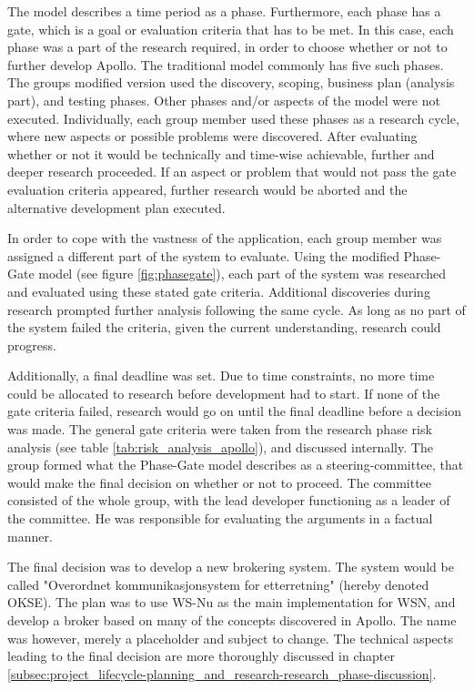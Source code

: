 The model describes a time period as a phase. Furthermore, each phase has a gate, which is a goal or evaluation criteria that has to be met. In this case, each phase was a part of the research required, in order to choose whether or not to further develop Apollo. The traditional model commonly has five such phases. The groups modified version used the discovery, scoping, business plan (analysis part), and testing phases. Other phases and/or aspects of the model were not executed. Individually, each group member used these phases as a research cycle, where new aspects or possible problems were discovered. After evaluating whether or not it would be technically and time-wise achievable, further and deeper research proceeded. If an aspect or problem that would not pass the gate evaluation criteria appeared, further research would be aborted and the alternative development plan executed.

In order to cope with the vastness of the application, each group member was assigned a different part of the system to evaluate. Using the modified Phase-Gate model (see figure \ref{fig:phasegate}), each part of the system was researched and evaluated using these stated gate criteria. Additional discoveries during research prompted further analysis following the same cycle. As long as no part of the system failed the criteria, given the current understanding, research could progress.

Additionally, a final deadline was set. Due to time constraints, no more time could be allocated to research before development had to start. If none of the gate criteria failed, research would go on until the final deadline before a decision was made. The general gate criteria were taken from the research phase risk analysis (see table \ref{tab:risk_analysis_apollo}), and discussed internally. The group formed what the Phase-Gate model describes as a steering-committee, that would make the final decision on whether or not to proceed. The committee consisted of the whole group, with the lead developer functioning as a leader of the committee. He was responsible for evaluating the arguments in a factual manner. 

The final decision was to develop a new brokering system. The system would be called "Overordnet kommunikasjonsystem for etterretning" (hereby denoted OKSE). The plan was to use WS-Nu as the main implementation for WSN, and develop a broker based on many of the concepts discovered in Apollo. The name was however, merely a placeholder and subject to change. The technical aspects leading to the final decision are more thoroughly discussed in chapter \ref{subsec:project_lifecycle-planning_and_research-research_phase-discussion}.

